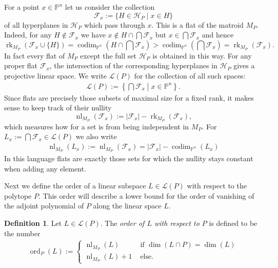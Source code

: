 \documentclass[a4paper,10pt]{amsart}
\theoremstyle{definition}
\newtheorem{defin}{Definition}[section]
\theoremstyle{plain}
\newcommand{\codim}{\operatorname{codim}}
\newcommand{\ord}{\operatorname{ord}}
\newcommand{\rk}{\operatorname{rk}}
\newcommand{\nl}{\operatorname{nl}}
\newcommand{\cF}{{\mathcal F}}
\newcommand{\cH}{{\mathcal H}}
\newcommand{\cL}{{\mathcal L}}
\newcommand{\pp}{\mathbb{P}}
\begin{document}
For a point $x\in \pp^n$ let us consider the collection
\begin{equation*}
    \cF_x:=\{H\in \cH_P\mid x \in H\}
\end{equation*}
of all hyperplanes in $\cH_P$ which pass through $x$. This is a flat of the matroid $M_P$. Indeed, for any $H\notin \cF_x$ we have $x \notin H\cap\bigcap\cF_x$ but $x \in \bigcap\cF_x$ and hence
\begin{equation*}
    \rk_{M_P}(\cF_x\cup \{H\})=\codim_{\pp^n}\left( H\cap\bigcap\cF_x\right)> \codim_{\pp^n}\left(\bigcap\cF_x\right)=\rk_{M_P}(\cF_x).
\end{equation*}
In fact every flat of $M_P$ except the full set $\cH_P$ is obtained in this way. For any proper flat $\cF_x$, the intersection of the corresponding hyperplanes in $\cH_P$ gives a projective linear space. We write $\cL(P)$ for the collection of all such spaces: \begin{align*}
    \cL(P):=\left\{\bigcap\cF_x \middle| x \in \pp^n \right\}.
\end{align*}
Since flats are precisely those subsets of maximal size for a fixed rank, it makes sense to keep track of their nullity
\begin{equation*}
    \nl_{M_P}(\cF_x):=|\cF_x|-\rk_{M_P}(\cF_x),
\end{equation*}
which measures how for a set is from being independent in $M_P$. For $L_x:=\bigcap \cF_x \in \cL(P)$ we also write \begin{align*}
    \nl_{M_P}(L_x):=\nl_{M_P}(\cF_x)=|\cF_x|-\codim_{\pp^n}(L_x)
\end{align*} In this language flats are exactly those sets for which the nullity stays constant when adding any element.

Next we define the order of a linear subspace $L\in \cL(P)$ with respect to the polytope $P$. This order will describe a lower bound for the order of vanishing of the adjoint polynomial of $P$ along the linear space $L$.
\begin{defin}
\label{def:order_general}
    Let $L\in \cL(P)$. The \emph{order of $L$ with respect to $P$} is defined to be the number \begin{align*}
    \ord_P(L):=\begin{cases}
        \nl_{M_P}(L) &\text{ if } \dim(L\cap P)=\dim(L) \\
        \nl_{M_P}(L)+1 &\text{ else}.
    \end{cases}
 \end{align*}
\end{defin}
\end{document}
